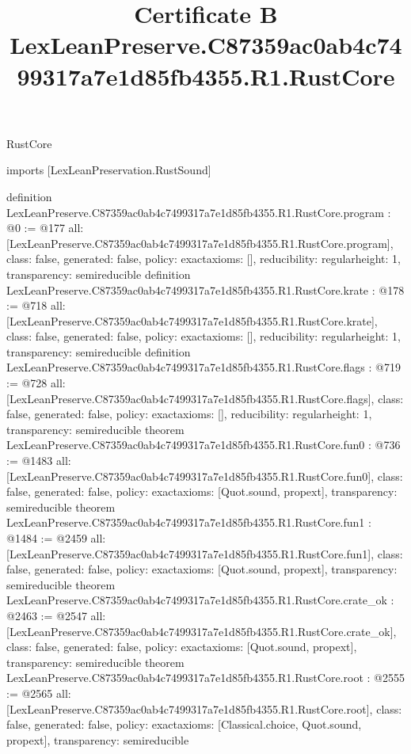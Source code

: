 \begin{lexlean}{RustCore}
\title{Certificate B LexLeanPreserve.C87359ac0ab4c7499317a7e1d85fb4355.R1.RustCore}
\begin{coremodule}
imports [LexLeanPreservation.RustSound]

definition LexLeanPreserve.C87359ac0ab4c7499317a7e1d85fb4355.R1.RustCore.program : @0 := @177 {
  all: [LexLeanPreserve.C87359ac0ab4c7499317a7e1d85fb4355.R1.RustCore.program],
  class: false,
  generated: false,
  policy: exact{axioms: []},
  reducibility: regular{height: 1},
  transparency: semireducible
}
definition LexLeanPreserve.C87359ac0ab4c7499317a7e1d85fb4355.R1.RustCore.krate : @178 := @718 {
  all: [LexLeanPreserve.C87359ac0ab4c7499317a7e1d85fb4355.R1.RustCore.krate],
  class: false,
  generated: false,
  policy: exact{axioms: []},
  reducibility: regular{height: 1},
  transparency: semireducible
}
definition LexLeanPreserve.C87359ac0ab4c7499317a7e1d85fb4355.R1.RustCore.flags : @719 := @728 {
  all: [LexLeanPreserve.C87359ac0ab4c7499317a7e1d85fb4355.R1.RustCore.flags],
  class: false,
  generated: false,
  policy: exact{axioms: []},
  reducibility: regular{height: 1},
  transparency: semireducible
}
theorem LexLeanPreserve.C87359ac0ab4c7499317a7e1d85fb4355.R1.RustCore.fun0 : @736 := @1483 {
  all: [LexLeanPreserve.C87359ac0ab4c7499317a7e1d85fb4355.R1.RustCore.fun0],
  class: false,
  generated: false,
  policy: exact{axioms: [Quot.sound, propext]},
  transparency: semireducible
}
theorem LexLeanPreserve.C87359ac0ab4c7499317a7e1d85fb4355.R1.RustCore.fun1 : @1484 := @2459 {
  all: [LexLeanPreserve.C87359ac0ab4c7499317a7e1d85fb4355.R1.RustCore.fun1],
  class: false,
  generated: false,
  policy: exact{axioms: [Quot.sound, propext]},
  transparency: semireducible
}
theorem LexLeanPreserve.C87359ac0ab4c7499317a7e1d85fb4355.R1.RustCore.crate_ok : @2463 := @2547 {
  all: [LexLeanPreserve.C87359ac0ab4c7499317a7e1d85fb4355.R1.RustCore.crate_ok],
  class: false,
  generated: false,
  policy: exact{axioms: [Quot.sound, propext]},
  transparency: semireducible
}
theorem LexLeanPreserve.C87359ac0ab4c7499317a7e1d85fb4355.R1.RustCore.root : @2555 := @2565 {
  all: [LexLeanPreserve.C87359ac0ab4c7499317a7e1d85fb4355.R1.RustCore.root],
  class: false,
  generated: false,
  policy: exact{axioms: [Classical.choice, Quot.sound, propext]},
  transparency: semireducible
}


\end{coremodule}
\end{lexlean}
